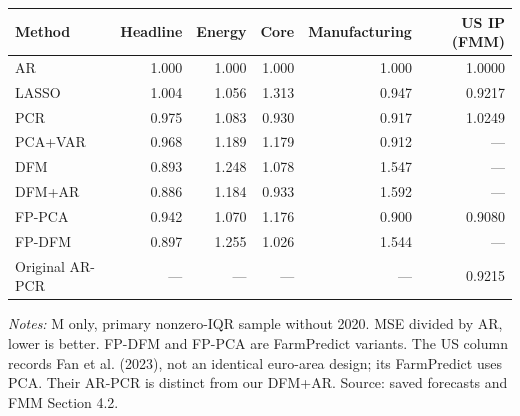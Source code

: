 \begin{threeparttable}
\begin{tabular}{lrrrrr}
\toprule
Method & Headline & Energy & Core & Manufacturing & US IP (FMM) \\
\midrule
AR & 1.000 & 1.000 & 1.000 & 1.000 & 1.0000 \\
LASSO & 1.004 & 1.056 & 1.313 & 0.947 & 0.9217 \\
PCR & 0.975 & 1.083 & 0.930 & 0.917 & 1.0249 \\
PCA+VAR & 0.968 & 1.189 & 1.179 & 0.912 & --- \\
DFM & 0.893 & 1.248 & 1.078 & 1.547 & --- \\
DFM+AR & 0.886 & 1.184 & 0.933 & 1.592 & --- \\
FP-PCA & 0.942 & 1.070 & 1.176 & 0.900 & 0.9080 \\
FP-DFM & 0.897 & 1.255 & 1.026 & 1.544 & --- \\
Original AR-PCR & --- & --- & --- & --- & 0.9215 \\
\bottomrule
\end{tabular}
\begin{tablenotes}[flushleft]\footnotesize
\item \textit{Notes:} M only, primary nonzero-IQR sample without 2020. MSE divided by AR, lower is better. FP-DFM and FP-PCA are FarmPredict variants. The US column records Fan et al. (2023), not an identical euro-area design; its FarmPredict uses PCA. Their AR-PCR is distinct from our DFM+AR. Source: saved forecasts and FMM Section 4.2.
\end{tablenotes}
\end{threeparttable}
